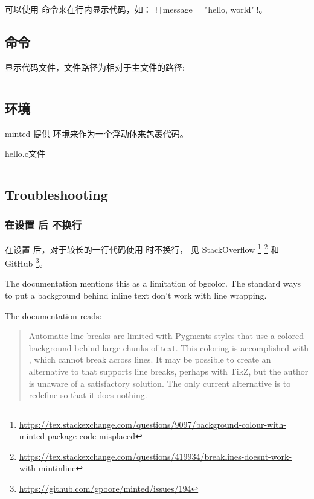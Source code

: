 可以使用  命令来在行内显示代码，如：
\texttt!\texttt|message = "hello, world"|!。

\subsection{\protect{} 命令}

显示代码文件，文件路径为相对于主文件的路径:

\begin{texcode}
\inputminted{c}{snippets/codelistings/helloworld.c}
\end{texcode}

\subsection{\protect{} 环境}

minted 提供  环境来作为一个浮动体来包裹代码。

\begin{texcode}
\begin{listing}[H]
  \caption{hello.c文件}
  \inputminted{c}{snippets/codelistings/helloworld.c}
\end{listing}
\end{texcode}

\subsection{Troubleshooting}

\subsubsection{在设置 \protect{} 后 \protect{} 不换行}

在设置  后，对于较长的一行代码使用  时不换行，
见 StackOverflow
\footnote{\url{https://tex.stackexchange.com/questions/9097/background-colour-with-minted-package-code-misplaced}}
\footnote{\url{https://tex.stackexchange.com/questions/419934/breaklines-doesnt-work-with-mintinline}}
和 GitHub
\footnote{\url{https://github.com/gpoore/minted/issues/194}}。

The documentation mentions this as a limitation of bgcolor. The standard ways to put a background behind inline text don't work with line wrapping.

The documentation reads:

\begin{quote}
  Automatic line breaks are limited with Pygments styles that use a colored background behind large chunks of text. This coloring is accomplished with ,
  which cannot break across lines. It may be possible to create an alternative to
   that supports line breaks, perhaps with TikZ, but the author is unaware
  of a satisfactory solution. The only current alternative is to redefine  so
  that it does nothing. 
\end{quote}

